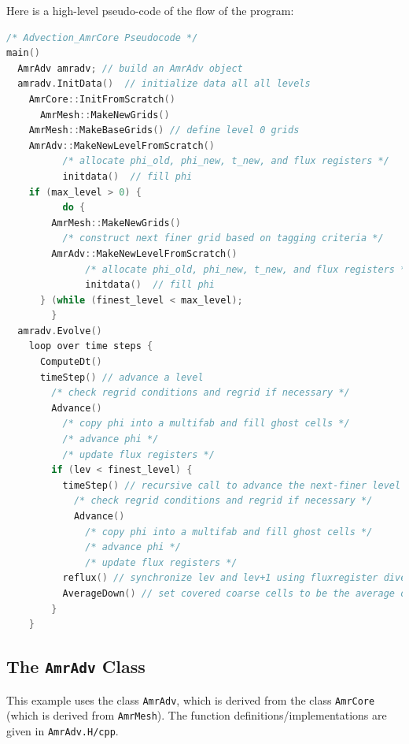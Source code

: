 Here is a high-level pseudo-code of the flow of the program:
\begin{lstlisting}[language=cpp]
/* Advection_AmrCore Pseudocode */
main()
  AmrAdv amradv; // build an AmrAdv object
  amradv.InitData()  // initialize data all all levels
    AmrCore::InitFromScratch()
      AmrMesh::MakeNewGrids()
	AmrMesh::MakeBaseGrids() // define level 0 grids
	AmrAdv::MakeNewLevelFromScratch()
          /* allocate phi_old, phi_new, t_new, and flux registers */
          initdata()  // fill phi
	if (max_level > 0) {
          do {
  	    AmrMesh::MakeNewGrids()
	      /* construct next finer grid based on tagging criteria */
 	    AmrAdv::MakeNewLevelFromScratch()
              /* allocate phi_old, phi_new, t_new, and flux registers */
              initdata()  // fill phi
	  } (while (finest_level < max_level);
        }
  amradv.Evolve()
    loop over time steps {
      ComputeDt()
      timeStep() // advance a level
        /* check regrid conditions and regrid if necessary */
        Advance()
          /* copy phi into a multifab and fill ghost cells */
          /* advance phi */
          /* update flux registers */
        if (lev < finest_level) {
          timeStep() // recursive call to advance the next-finer level "r" times
            /* check regrid conditions and regrid if necessary */
            Advance()
              /* copy phi into a multifab and fill ghost cells */
              /* advance phi */
              /* update flux registers */
          reflux() // synchronize lev and lev+1 using fluxregister divergence
          AverageDown() // set covered coarse cells to be the average of fine
        }
    }
\end{lstlisting}

\subsection{The {\tt AmrAdv} Class}
This example uses the class {\tt AmrAdv}, which is derived from the class {\tt AmrCore} 
(which is derived from {\tt AmrMesh}).  The function definitions/implementations
are given in {\tt AmrAdv.H/cpp}.

